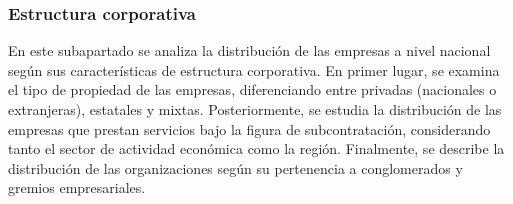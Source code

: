 \documentclass[
  11pt,
]{article}
\begin{document}
\FloatBarrier

\begin{table}

\caption{\label{tbl-acteco}Empresas y trabajadores según sector de
actividad económica}


\end{table}%

\FloatBarrier

\subsubsection{Estructura corporativa}\label{estructura-corporativa}

En este subapartado se analiza la distribución de las empresas a nivel
nacional según sus características de estructura corporativa. En primer
lugar, se examina el tipo de propiedad de las empresas, diferenciando
entre privadas (nacionales o extranjeras), estatales y mixtas.
Posteriormente, se estudia la distribución de las empresas que prestan
servicios bajo la figura de subcontratación, considerando tanto el
sector de actividad económica como la región. Finalmente, se describe la
distribución de las organizaciones según su pertenencia a conglomerados
y gremios empresariales.
\end{document}
